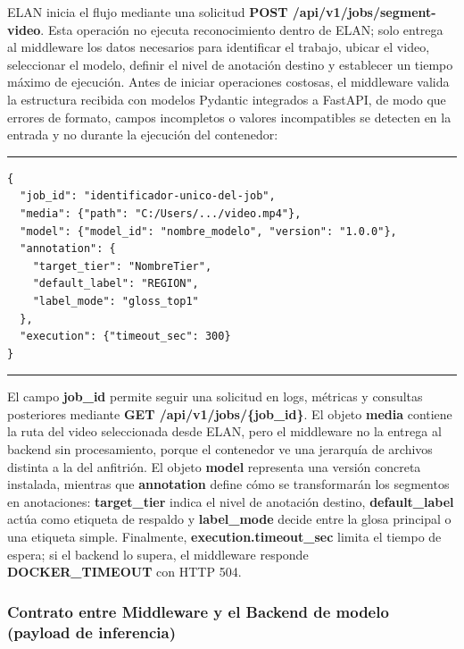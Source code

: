 ELAN inicia el flujo mediante una solicitud \textbf{POST /api/v1/jobs/segment-video}. Esta operación no ejecuta reconocimiento dentro de ELAN; solo entrega al middleware los datos necesarios para identificar el trabajo, ubicar el video, seleccionar el modelo, definir el nivel de anotación destino y establecer un tiempo máximo de ejecución. Antes de iniciar operaciones costosas, el middleware valida la estructura recibida con modelos Pydantic integrados a FastAPI, de modo que errores de formato, campos incompletos o valores incompatibles se detecten en la entrada y no durante la ejecución del contenedor:

\begin{center}
\begin{minipage}{0.82\textwidth}
\hrule
\vspace{0.12cm}
\small
\begin{Verbatim}[baselinestretch=0.82]
{
  "job_id": "identificador-unico-del-job",
  "media": {"path": "C:/Users/.../video.mp4"},
  "model": {"model_id": "nombre_modelo", "version": "1.0.0"},
  "annotation": {
    "target_tier": "NombreTier",
    "default_label": "REGION",
    "label_mode": "gloss_top1"
  },
  "execution": {"timeout_sec": 300}
}
\end{Verbatim}
\vspace{0.05cm}
\hrule

\label{lst:request_elan_middleware}
\end{minipage}
\end{center}

El campo \textbf{job\_id} permite seguir una solicitud en logs, métricas y consultas posteriores mediante \textbf{GET /api/v1/jobs/\{job\_id\}}. El objeto \textbf{media} contiene la ruta del video seleccionada desde ELAN, pero el middleware no la entrega al backend sin procesamiento, porque el contenedor ve una jerarquía de archivos distinta a la del anfitrión. El objeto \textbf{model} representa una versión concreta instalada, mientras que \textbf{annotation} define cómo se transformarán los segmentos en anotaciones: \textbf{target\_tier} indica el nivel de anotación destino, \textbf{default\_label} actúa como etiqueta de respaldo y \textbf{label\_mode} decide entre la glosa principal o una etiqueta simple. Finalmente, \textbf{execution.timeout\_sec} limita el tiempo de espera; si el backend lo supera, el middleware responde \textbf{DOCKER\_TIMEOUT} con HTTP 504.

\subsubsection{Contrato entre Middleware y el Backend de modelo (payload de inferencia)}

